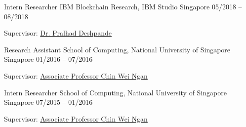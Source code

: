 

\begin{cventries}

  
  \cventry
    {Intern Researcher} %
    {IBM Blockchain Research, IBM Studio} %
    {Singapore} %
    {05/2018 -- 08/2018} %
    {
      \begin{cvitems} %
        \item {Supervisor: \href{https://www.linkedin.com/in/pralhad-deshpande-97688010/}{Dr. Pralhad Deshpande}}
      \end{cvitems}
    }



  \cventry
    {Research Assistant} %
    {School of Computing, National University of Singapore} %
    {Singapore} %
    {01/2016 -- 07/2016} %
    {
      \begin{cvitems} %
        \item {Supervisor: \href{https://www.comp.nus.edu.sg/~chinwn/}{Associate Professor Chin Wei Ngan}}
      \end{cvitems}
    }



  \cventry
    {Intern Researcher} %
    {School of Computing, National University of Singapore} %
    {Singapore} %
    {07/2015 -- 01/2016} %
    {
      \begin{cvitems} %
        \item {Supervisor: \href{https://www.comp.nus.edu.sg/~chinwn/}{Associate Professor Chin Wei Ngan}}
      \end{cvitems}
    }


\end{cventries}
